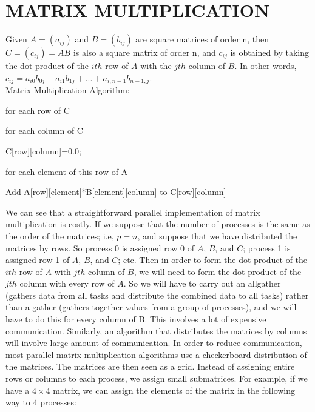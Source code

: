 \documentclass[]{scrartcl}
\begin{document}
\section{MATRIX MULTIPLICATION}
Given $A=(a_{ij})$ and $B=(b_{ij})$ are square matrices of order n, then $C=(c_{ij})=AB$ is also a square matrix of order n, and $c_{ij}$ is obtained by taking the dot product of the $ith$ row of $A$ with the $jth$ column of $B$. In other words, $c_{ij}=a_{i0}b_{0j}+a_{i1}b_{1j}+...+a_{i,n-1}b_{n-1,j}$.  \\

Matrix Multiplication Algorithm:

\begin{enumerate}
	\item for each row of C
	{\setlength\itemindent{25pt} \item for each column of C }
	{\setlength\itemindent{50pt} \item C[row][column]=0.0; }
	{\setlength\itemindent{50pt} \item for each element of this row of A }
	{\setlength\itemindent{75pt} \item Add A[row][element]*B[element][column] to C[row][column]}	
\end{enumerate}

We can see that a straightforward parallel implementation of matrix multiplication is costly. If we suppose that the number of processes is the same as the order of the matrices; i.e, $p=n$, and suppose that we have distributed the matrices by rows. So process 0 is assigned row 0 of $A$, $B$, and $C$; process 1 is assigned row 1 of $A$, $B$, and $C$; etc. Then in order to form the dot product of the $ith$ row of $A$ with $jth$ column of $B$, we will need to form the dot product of the $jth$ column with every row of $A$. So we will have to carry out an allgather (gathers data from all tasks and distribute the combined data to all tasks) rather than a gather (gathers together values from a group of processes), and we will have to do this for every column of B. This involves a lot of expensive communication. Similarly, an algorithm that distributes the matrices by columns will involve large amount of communication. In order to reduce communication, most parallel matrix multiplication algorithms use a checkerboard distribution of the matrices. The matrices are then seen as a grid. Instead of assigning entire rows or columns to each process, we assign small submatrices. For example, if we have a $4\times4$ matrix, we can assign the elements of the matrix in the following way to 4 processes: 
\end{document}
